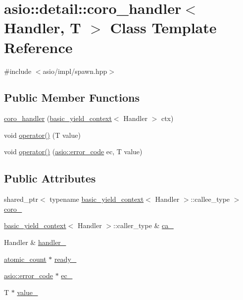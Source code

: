 \hypertarget{classasio_1_1detail_1_1coro__handler}{}\section{asio\+:\+:detail\+:\+:coro\+\_\+handler$<$ Handler, T $>$ Class Template Reference}
\label{classasio_1_1detail_1_1coro__handler}


{\ttfamily \#include $<$asio/impl/spawn.\+hpp$>$}

\subsection*{Public Member Functions}
\begin{DoxyCompactItemize}
\item 
\hyperlink{classasio_1_1detail_1_1coro__handler_abe7945533555f86332e7195cf0c43e60}{coro\+\_\+handler} (\hyperlink{classasio_1_1basic__yield__context}{basic\+\_\+yield\+\_\+context}$<$ Handler $>$ ctx)
\item 
void \hyperlink{classasio_1_1detail_1_1coro__handler_aa7d47bf83d2111577e276be31f9e911a}{operator()} (T value)
\item 
void \hyperlink{classasio_1_1detail_1_1coro__handler_af966e89157a9be84c8825029a2672a95}{operator()} (\hyperlink{classasio_1_1error__code}{asio\+::error\+\_\+code} ec, T value)
\end{DoxyCompactItemize}
\subsection*{Public Attributes}
\begin{DoxyCompactItemize}
\item 
shared\+\_\+ptr$<$ typename \hyperlink{classasio_1_1basic__yield__context}{basic\+\_\+yield\+\_\+context}$<$ Handler $>$\+::callee\+\_\+type $>$ \hyperlink{classasio_1_1detail_1_1coro__handler_ade2c5b3ffa7a8133cf377722ae9927ba}{coro\+\_\+}
\item 
\hyperlink{classasio_1_1basic__yield__context}{basic\+\_\+yield\+\_\+context}$<$ Handler $>$\+::caller\+\_\+type \& \hyperlink{classasio_1_1detail_1_1coro__handler_a5f0b1e6395c255b96ca25c35a4b9aaf8}{ca\+\_\+}
\item 
Handler \& \hyperlink{classasio_1_1detail_1_1coro__handler_a093789199f45e6730fff1953320988d6}{handler\+\_\+}
\item 
\hyperlink{namespaceasio_1_1detail_a75f94bf579dec2f59a0c4af6c4c3606e}{atomic\+\_\+count} $\ast$ \hyperlink{classasio_1_1detail_1_1coro__handler_af0de99911da9c638f145fd4cda8056a5}{ready\+\_\+}
\item 
\hyperlink{classasio_1_1error__code}{asio\+::error\+\_\+code} $\ast$ \hyperlink{classasio_1_1detail_1_1coro__handler_a3ccc5748759a0aab189fbb1c7b9ef54c}{ec\+\_\+}
\item 
T $\ast$ \hyperlink{classasio_1_1detail_1_1coro__handler_adec5b58707ea63ea81b7bbd808826cad}{value\+\_\+}
\end{DoxyCompactItemize}


